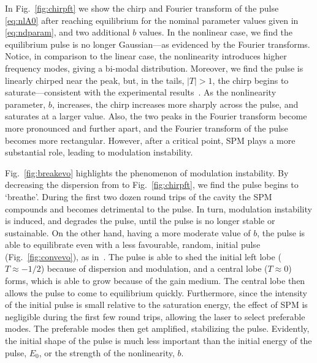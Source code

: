 \documentclass[9pt,twocolumn,twoside]{osajnl}
\begin{document}
In Fig.~\ref{fig:chirpft} we show the chirp and Fourier transform of the pulse \eqref{eq:nlA0} after reaching equilibrium for the nominal parameter values given in \eqref{eq:ndparam}, and two additional $b$ values. In the nonlinear case, we find the equilibrium pulse is no longer Gaussian---as evidenced by the Fourier transforms. Notice, in comparison to the linear case, the nonlinearity introduces higher frequency modes, giving a bi-modal distribution. Moreover, we find the pulse is linearly chirped near the peak, but, in the tails, $|T| > 1$, the chirp begins to saturate---consistent with the experimental results~\cite{chen2008, rothenberg1989b, tomlinson1985}. As the nonlinearity parameter, $b$, increases, the chirp increases more sharply across the pulse, and saturates at a larger value. Also, the two peaks in the Fourier transform become more pronounced and further apart, and the Fourier transform of the pulse becomes more rectangular. However, after a critical point, SPM plays a more substantial role, leading to modulation instability.

Fig.~\ref{fig:breakevo} highlights the phenomenon of modulation instability. By decreasing the dispersion from to Fig.~\ref{fig:chirpft}, we find the pulse begins to `breathe'. During the first two dozen round trips of the cavity the SPM compounds and becomes detrimental to the pulse. In turn, modulation instability is induced, and degrades the pulse, until the pulse is no longer stable or sustainable. On the other hand, having a more moderate value of $b$, the pulse is able to equilibrate even with a less favourable, random, initial pulse (Fig.~\ref{fig:convevo}), as in~\cite{meng2020}. The pulse is able to shed the initial left lobe ($T \approx -1 / 2$) because of dispersion and modulation, and a central lobe ($T \approx 0$) forms, which is able to grow because of the gain medium. The central lobe then allows the pulse to come to equilibrium quickly. Furthermore, since the intensity of the initial pulse is small relative to the saturation energy, the effect of SPM is negligible during the first few round trips, allowing the laser to select preferable modes. The preferable modes then get amplified, stabilizing the pulse. Evidently, the initial shape of the pulse is much less important than the initial energy of the pulse, $E_0$, or the strength of the nonlinearity, $b$.
\end{document}
